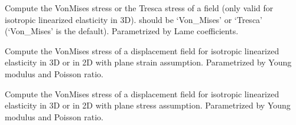 \documentclass[a4paper,11pt,english]{sphinxmanual}
\begin{document}
\begin{fulllineitems}
\begin{fulllineitems}
\label{\detokenize{python/cmdref_Model:getfem.Model.compute_isotropic_linearized_Von_Mises_or_Tresca}}
Compute the Von\sphinxhyphen{}Mises stress or the Tresca stress of a field (only
valid for isotropic linearized elasticity in 3D).  should
be  ‘Von\_Mises’ or ‘Tresca’ (‘Von\_Mises’ is the default).
Parametrized by Lame coefficients.

\end{fulllineitems}


\begin{fulllineitems}
\label{\detokenize{python/cmdref_Model:getfem.Model.compute_isotropic_linearized_Von_Mises_pstrain}}
Compute the Von\sphinxhyphen{}Mises stress  of a displacement field for isotropic
linearized elasticity in 3D or in 2D with plane strain assumption.
Parametrized by Young modulus and Poisson ratio.

\end{fulllineitems}


\begin{fulllineitems}
\label{\detokenize{python/cmdref_Model:getfem.Model.compute_isotropic_linearized_Von_Mises_pstress}}
Compute the Von\sphinxhyphen{}Mises stress  of a displacement field for isotropic
linearized elasticity in 3D or in 2D with plane stress assumption.
Parametrized by Young modulus and Poisson ratio.


\end{fulllineitems}
\end{fulllineitems}
\end{document}
